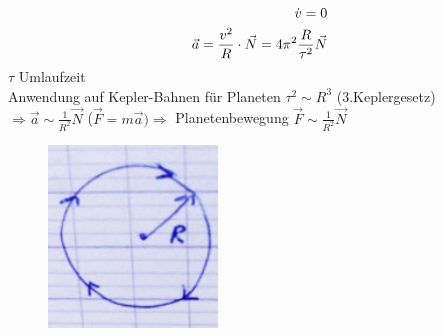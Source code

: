 \begin{description}
\begin{enumerate}
\begin{align*}
\dot{v}=0\\
\vec{a}=\frac{v^2}{R}\cdot \vec{N}=4\pi^2\frac{R}{\tau^2}\vec{N}
\end{align*}
$\tau$ Umlaufzeit\\
Anwendung auf Kepler-Bahnen für Planeten $\tau^2\sim R^3$ (3.Keplergesetz)\\
$\Rightarrow\vec{a}\sim \frac{1}{R^2}\vec{N}$ ($\vec{F}=m\vec{a}) \Rightarrow$ Planetenbewegung $\vec{F}\sim \frac{1}{R^2}\vec{N}$
\begin{figure}[h]
\begin{center}
\includegraphics[width=0.4\textwidth]{Skizzen/Anhang7.jpg}
\end{center}
\caption{}
\end{figure}
\end{enumerate}
\end{description}
